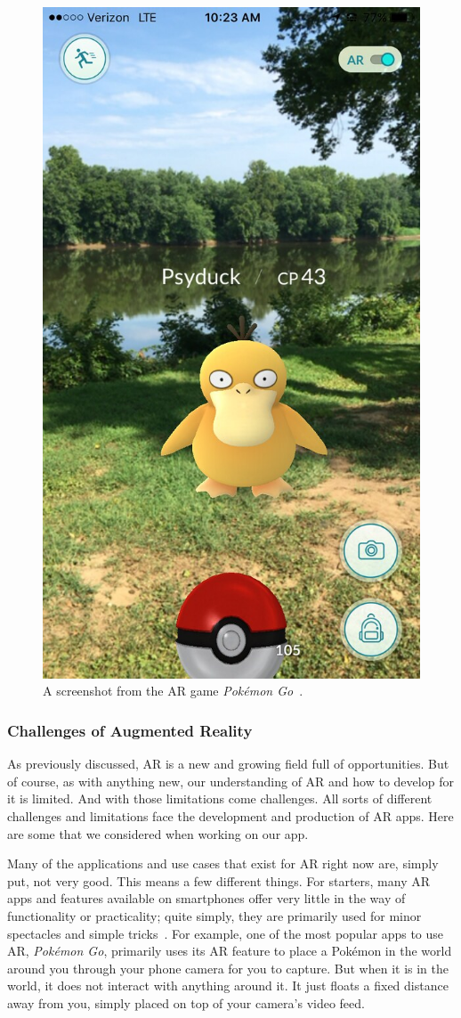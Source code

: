 \documentclass[a4paper, 10pt, american, titlepage]{article}
\begin{document}
\begin{figure}[h]
	\centering
	\includegraphics[width=.5\textwidth]{pokemon-go.jpg}
	\caption[A screenshot from the AR game \textit{Pokémon Go}]{A screenshot
		from the AR game \textit{Pokémon Go}~\autocite{vastateparks2016}.}
	\label{fig:pokemonGo}
\end{figure}

\subsubsection{Challenges of Augmented Reality}
\label{sec:challengesOfAugmentedReality}

As previously discussed, AR is a new and growing field full of opportunities.
But of course, as with anything new, our understanding of AR and how to develop
for it is limited.  And with those limitations come challenges. All sorts of
different challenges and limitations face the development and production of AR
apps. Here are some that we considered when working on our app.

Many of the applications and use cases that exist for AR right now are, simply
put, not very good. This means a few different things. For starters, many AR
apps and features available on smartphones offer very little in the way of
functionality or practicality; quite simply, they are primarily used for minor
spectacles and simple tricks~\autocite{theappsolutions2018}. For example, one of
the most popular apps to use AR, \textit{Pokémon Go}, primarily uses its AR
feature to place a Pokémon in the world around you through your phone camera for
you to capture. But when it is in the world, it does not interact with anything
around it. It just floats a fixed distance away from you, simply placed on top
of your camera's video feed.
\end{document}
